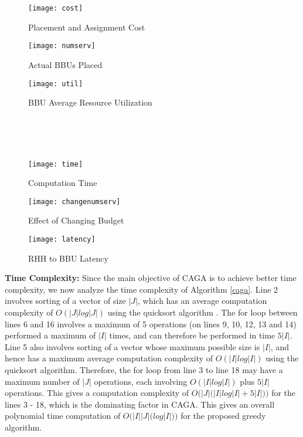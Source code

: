 \documentclass[conference]{IEEEtran}
\begin{document}
\begin{figure*}[ht!]
\setlength{\abovecaptionskip}{7pt plus 0pt minus 0pt}
\setlength{\belowcaptionskip}{7pt plus 0pt minus 0pt}
\begin{minipage}{.33\textwidth}
\centering
\resizebox{.99\textwidth}{!}
{\texttt{[image: cost]}}
  \caption{Placement and Assignment Cost}
  \label{cost}
\end{minipage}
\begin{minipage}{.33\textwidth}
\centering
\resizebox{0.99\textwidth}{!}
{\texttt{[image: numserv]}}
  \caption{Actual BBUs Placed}
  \label{numserv}
\end{minipage}
\begin{minipage}{.33\textwidth}
\centering
\resizebox{0.99\textwidth}{!}
{\texttt{[image: util]}}
  \caption{BBU Average Resource Utilization}
  \label{util}
\end{minipage}\\\\\\

\begin{minipage}{.33\textwidth}
\centering
\resizebox{.99\textwidth}{!}
{\texttt{[image: time]}}
  \caption{Computation Time}
  \label{time}
\end{minipage}
\begin{minipage}{.33\textwidth}
\resizebox{.99\textwidth}{!}
{\texttt{[image: changenumserv]}}
  \caption{Effect of Changing Budget}
  \label{changenumserv}
\end{minipage}
\begin{minipage}{.33\textwidth}
\resizebox{.99\textwidth}{!}
{\texttt{[image: latency]}}
  \caption{RHH to BBU Latency}
  \label{latency}
\end{minipage}
\end{figure*}



\noindent \textbf{Time Complexity:} Since the main objective of CAGA is to achieve better time complexity, we now analyze the time complexity of Algorithm \ref{caga}. Line 2 involves sorting of a vector of size $|J|$, which has an average computation complexity of $O(|J| log |J|)$ using the quicksort algorithm \cite{Alsuwaiyel98}. The for loop between lines 6 and 16 involves a maximum of 5 operations (on lines 9, 10, 12, 13 and 14) performed a maximum of $|I|$ times, and can therefore be performed in time $5|I|$. Line 5 also involves sorting of a vector whose maximum possible size is $|I|$, and hence has a maximum average computation complexity of $O(|I| log |I|)$ using the quicksort algorithm. Therefore, the for loop from line 3 to line 18 may have a maximum number of $|J|$ operations, each involving  $O(|I| log |I|)$ plus $5|I|$ operations. This gives a computation complexity of $O\Big(|J| \big(|I| log |I| + 5|I|\big)\Big)$ for the lines 3 - 18, which is the dominating factor in CAGA. This gives an overall polynomial time computation of $O\Big(|I||J|\big(log |I|\big)\Big)$ for the proposed greedy algorithm.
\end{document}
